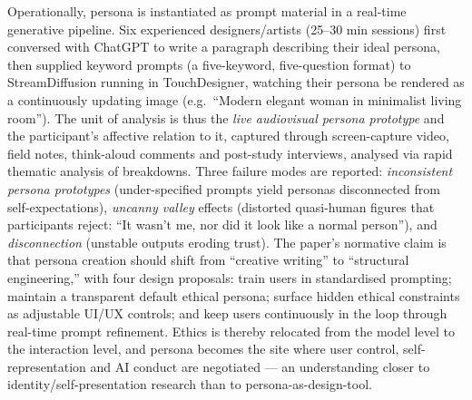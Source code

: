 Operationally, persona is instantiated as prompt material in a real-time generative pipeline. Six experienced designers/artists (25--30 min sessions) first conversed with ChatGPT to write a paragraph describing their ideal persona, then supplied keyword prompts (a five-keyword, five-question format) to StreamDiffusion running in TouchDesigner, watching their persona be rendered as a continuously updating image (e.g.\ ``Modern elegant woman in minimalist living room''). The unit of analysis is thus the \emph{live audiovisual persona prototype} and the participant's affective relation to it, captured through screen-capture video, field notes, think-aloud comments and post-study interviews, analysed via rapid thematic analysis of breakdowns. Three failure modes are reported: \emph{inconsistent persona prototypes} (under-specified prompts yield personas disconnected from self-expectations), \emph{uncanny valley} effects (distorted quasi-human figures that participants reject: ``It wasn't me, nor did it look like a normal person''), and \emph{disconnection} (unstable outputs eroding trust). The paper's normative claim is that persona creation should shift from ``creative writing'' to ``structural engineering,'' with four design proposals: train users in standardised prompting; maintain a transparent default ethical persona; surface hidden ethical constraints as adjustable UI/UX controls; and keep users continuously in the loop through real-time prompt refinement. Ethics is thereby relocated from the model level to the interaction level, and persona becomes the site where user control, self-representation and AI conduct are negotiated --- an understanding closer to identity/self-presentation research than to persona-as-design-tool.

